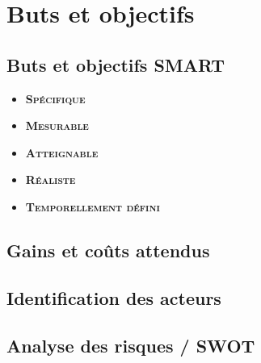 \section{Buts et objectifs}

\subsection{Buts et objectifs SMART}

\begin{itemize}
    \item \textsc{\textbf{Spécifique}}
    \item \textsc{\textbf{Mesurable}}
    \item \textsc{\textbf{Atteignable}}
    \item \textsc{\textbf{Réaliste}}
    \item \textsc{\textbf{Temporellement défini}}
\end{itemize}

\subsection{Gains et coûts attendus}

\subsection{Identification des acteurs}

\subsection{Analyse des risques / SWOT}

